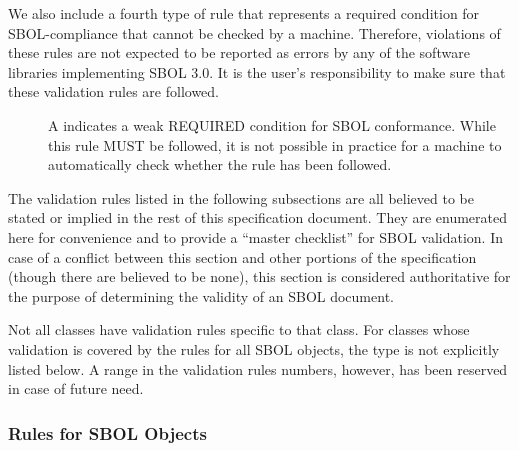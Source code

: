 We also include a fourth type of rule that represents a required condition for SBOL-compliance that cannot be checked by a machine. Therefore, violations of these rules are not expected to be reported as errors by any of the software libraries implementing SBOL 3.0. It is the user's responsibility to make sure that these validation rules are followed.

\begin{description}
\item[\hspace*{6.5pt}\cSymbol\csp] A \cSymbolName indicates a weak REQUIRED condition for SBOL conformance. While this rule MUST be followed, it is not possible in practice for a machine to automatically check whether the rule has been followed.
\end{description}


The validation rules listed in the following subsections are all believed to be
stated or implied in the rest of this specification document.  They
are enumerated here for convenience and to provide a ``master
checklist'' for SBOL validation.  In case of a conflict between this
section and other portions of the specification (though there are believed to
be none), this section is considered authoritative for the purpose of
determining the validity of an SBOL document.

Not \notice all classes have validation rules specific to that class. 
For classes whose validation is covered by the rules for all SBOL objects, the type is not explicitly listed below.
A range in the validation rules numbers, however, has been reserved in case of future need.


\subsubsection*{Rules for SBOL Objects}
\setcounter{sbolCtr}{10101} 

